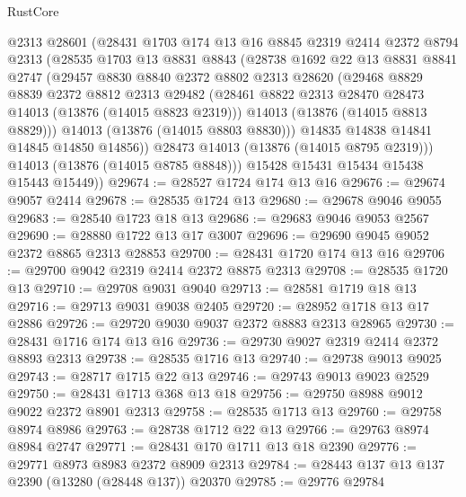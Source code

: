 \begin{lexlean}{RustCore}
\begin{coremodule}
          @2313
          @28601
          (@28431
            @1703
            @174
            @13
            @16
            @8845
            @2319
            @2414
            @2372
            @8794
            @2313
            (@28535
              @1703
              @13
              @8831
              @8843
              (@28738
                @1692
                @22
                @13
                @8831
                @8841
                @2747
                (@29457
                  @8830
                  @8840
                  @2372
                  @8802
                  @2313
                  @28620
                  (@29468
                    @8829
                    @8839
                    @2372
                    @8812
                    @2313
                    @29482
                    (@28461 @8822 @2313 @28470 @28473 @14013 (@13876 (@14015 @8823 @2319)))
                    @14013
                    (@13876 (@14015 @8813 @8829)))
                  @14013
                  (@13876 (@14015 @8803 @8830)))
                @14835
                @14838
                @14841
                @14845
                @14850
                @14856))
            @28473
            @14013
            (@13876 (@14015 @8795 @2319)))
          @14013
          (@13876 (@14015 @8785 @8848)))
        @15428
        @15431
        @15434
        @15438
        @15443
        @15449))
@29674 := @28527 @1724 @174 @13 @16
@29676 := @29674 @9057 @2414
@29678 := @28535 @1724 @13
@29680 := @29678 @9046 @9055
@29683 := @28540 @1723 @18 @13
@29686 := @29683 @9046 @9053 @2567
@29690 := @28880 @1722 @13 @17 @3007
@29696 := @29690 @9045 @9052 @2372 @8865 @2313 @28853
@29700 := @28431 @1720 @174 @13 @16
@29706 := @29700 @9042 @2319 @2414 @2372 @8875 @2313
@29708 := @28535 @1720 @13
@29710 := @29708 @9031 @9040
@29713 := @28581 @1719 @18 @13
@29716 := @29713 @9031 @9038 @2405
@29720 := @28952 @1718 @13 @17 @2886
@29726 := @29720 @9030 @9037 @2372 @8883 @2313 @28965
@29730 := @28431 @1716 @174 @13 @16
@29736 := @29730 @9027 @2319 @2414 @2372 @8893 @2313
@29738 := @28535 @1716 @13
@29740 := @29738 @9013 @9025
@29743 := @28717 @1715 @22 @13
@29746 := @29743 @9013 @9023 @2529
@29750 := @28431 @1713 @368 @13 @18
@29756 := @29750 @8988 @9012 @9022 @2372 @8901 @2313
@29758 := @28535 @1713 @13
@29760 := @29758 @8974 @8986
@29763 := @28738 @1712 @22 @13
@29766 := @29763 @8974 @8984 @2747
@29771 := @28431 @170 @1711 @13 @18 @2390
@29776 := @29771 @8973 @8983 @2372 @8909 @2313
@29784 := @28443 @137 @13 @137 @2390 (@13280 (@28448 @137)) @20370
@29785 := @29776 @29784

\end{coremodule}
\end{lexlean}
